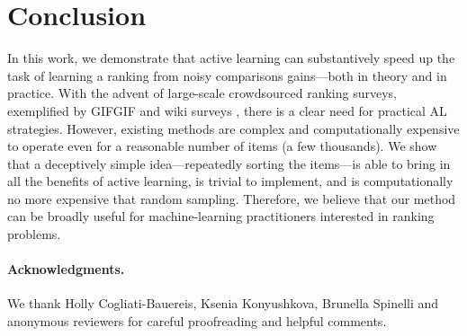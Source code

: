 \section{Conclusion}  %
\label{rs:sec:conclusion}

In this work, we demonstrate that active learning can substantively speed up the task of learning a ranking from noisy comparisons gains---both in theory and in practice.
With the advent of large-scale crowdsourced ranking surveys, exemplified by GIFGIF and wiki surveys \citep{salganik2015wiki}, there is a clear need for practical AL strategies.
However, existing methods are complex and computationally expensive to operate even for a reasonable number of items (a few thousands).
We show that a deceptively simple idea---repeatedly sorting the items---is able to bring in all the benefits of active learning, is trivial to implement, and is computationally no more expensive that random sampling.
Therefore, we believe that our method can be broadly useful for machine-learning practitioners interested in ranking problems.

\paragraph{Acknowledgments.}
We thank Holly Cogliati-Bauereis, Ksenia Konyushkova, Brunella Spinelli and anonymous reviewers for careful proofreading and helpful comments.
